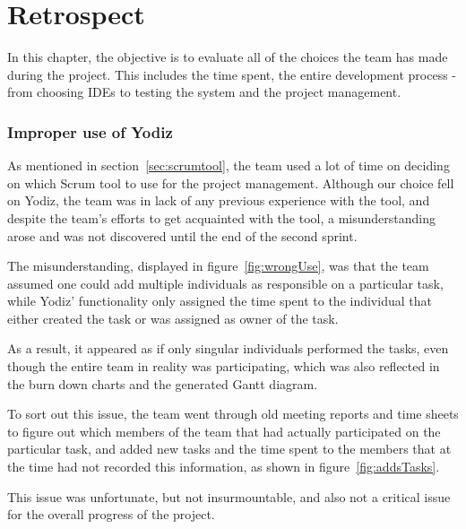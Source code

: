\chapter{Retrospect}
In this chapter, the objective is to evaluate all of the choices the team has made during the project. This includes the time spent, the entire development process - from choosing IDEs to testing the system and the project management. 






\subsection{Improper use of Yodiz}
\label{sec:improperScrum}
As mentioned in section~\ref{sec:scrumtool}, the team used a lot of time on
deciding on which Scrum tool to use for the project management. Although our
choice fell on Yodiz, the team was in lack of any previous experience with the
tool, and despite the team's efforts to get acquainted with the tool, a
misunderstanding arose and was not discovered until the end of the second
sprint.

The misunderstanding, displayed in figure~\ref{fig:wrongUse}, was that the team
assumed one could add multiple individuals as responsible on a particular task,
while Yodiz' functionality only assigned the time spent to the individual that
either created the task or was assigned as owner of the task.

As a result, it appeared as if only singular individuals performed the tasks,
even though the entire team in reality was participating, which was also
reflected in the burn down charts and the generated Gantt diagram. 

To sort out this issue, the team went through old meeting reports and time sheets
to figure out which members of the team that had actually participated on the
particular task, and added new tasks and the time spent to the members that at
the time had not recorded this information, as shown in
figure~\ref{fig:addsTasks}.

This issue was unfortunate, but not insurmountable, and also not a critical
issue for the overall progress of the project.

